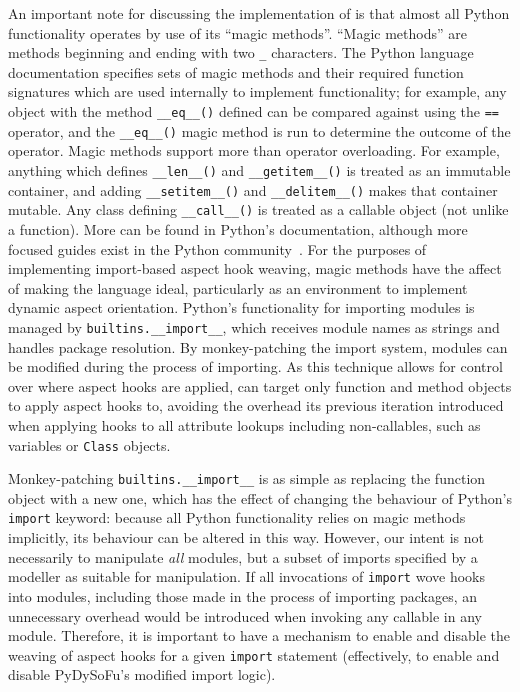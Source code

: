 An important note for discussing the implementation of \pdsf is that almost all
Python functionality operates by use of its ``magic methods''. ``Magic
methods'' are methods beginning and ending with two \lstinline{_} characters.
The Python language documentation specifies sets of magic methods and their
required function signatures which are used internally to implement
functionality; for example, any object with the method \lstinline{__eq__()}
defined can be compared against using the \lstinline{==} operator, and the
\lstinline{__eq__()} magic method is run to determine the outcome of the
operator. Magic methods support more than operator overloading. For example,
anything which defines \lstinline{__len__()} and \lstinline{__getitem__()} is
treated as an immutable container, and adding \lstinline{__setitem__()} and
\lstinline{__delitem__()} makes that container mutable. Any class defining
\lstinline{__call__()} is treated as a callable object (not unlike a function).
More can be found in Python's documentation\cite{py3docs}, although more
focused guides exist in the Python community~\cite{magicmethodguide}.
For the purposes of implementing import-based aspect hook weaving,
magic methods have the affect of making the language ideal, particularly as an environment to implement dynamic
aspect orientation. Python's functionality for importing modules is managed by
\lstinline{builtins.__import__}, which receives module names as strings and
handles package resolution. By monkey-patching the import system, modules can be
modified during the process of importing. As this technique allows for control
over where aspect hooks are applied, \pdsf can target only function and method
objects to apply aspect hooks to, avoiding the overhead its previous iteration
introduced when applying hooks to all attribute lookups including
non-callables, such as variables or \lstinline{Class} objects.

Monkey-patching \lstinline{builtins.__import__} is as simple as replacing the
function object with a new one, which has the effect of changing the behaviour
of Python's \lstinline{import} keyword: because all Python functionality relies
on magic methods implicitly, its behaviour can be altered in this way. However,
our intent is not necessarily to manipulate \emph{all} modules, but a subset of
imports specified by a modeller as suitable for manipulation. 
If all invocations of \lstinline{import} wove hooks into modules, including
those made in the process of importing packages, an unnecessary overhead would
be introduced when invoking any callable in any module.
Therefore, it is important to have a mechanism to enable and disable the weaving
of aspect hooks for a given \lstinline{import} statement (effectively, to enable and disable PyDySoFu's
modified import logic).

